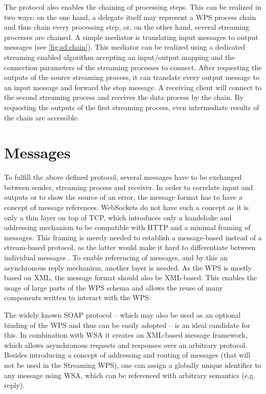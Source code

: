   The protocol also enables the chaining of processing steps. This can be realized in two ways: on the one hand, a delegate itself may represent a \ac{WPS} process chain and thus chain every processing step, or, on the other hand, several streaming processes are chained. A simple mediator is translating input messages to output messages (see \cref{fig:sd:chain}). This mediator can be realized using a dedicated streaming enabled algorithm accepting an input/output mapping and the connection parameters of the streaming processes to connect. After requesting the outputs of the source streaming process, it can translate every output message to an input message and forward the stop message. A receiving client will connect to the second streaming process and receives the data process by the chain. By requesting the outputs of the first streaming process, even intermediate results of the chain are accessible.

\section{Messages}
  \label{sec:streaming:messages}
  To fulfill the above defined protocol, several messages have to be exchanged between sender, streaming process and receiver. In order to correlate input and outputs or to show the source of an error, the message format has to have a concept of message references. WebSockets do not have such a concept as it is only a thin layer on top of TCP, which introduces only a handshake and addressing mechanism to be compatible with HTTP and a minimal framing of messages. This framing is merely needed to establish a message-based instead of a stream-based protocol, as the latter would make it hard to differentiate between individual messages \citep{ietf:rfc6455}. To enable referencing of messages, and by this an asynchronous reply mechanism, another layer is needed. As the \ac{WPS} is mostly based on \ac{XML}, the message format should also be \ac{XML}-based. This enables the usage of large parts of the \ac{WPS} schema and allows the reuse of many components written to interact with the \ac{WPS}.

  The widely known SOAP protocol \citep{w3c:soap1} -- which may also be used as an optional binding of the \ac{WPS} \citep{ogc:wps} and thus can be easily adopted -- is an ideal candidate for this. In combination with \ac{WSA} \citep{w3c:wsa} it creates an \ac{XML}-based message framework, which allows asynchronous requests and responses over an arbitrary protocol. Besides introducing a concept of addressing and routing of messages (that will not be used in the Streaming \ac{WPS}), one can assign a globally unique identifier to any message using \ac{WSA}, which can be referenced with arbitrary semantics (e.g. reply).


